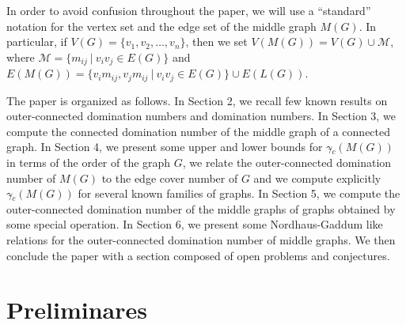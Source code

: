 \documentclass[a4paper,12pt, reqno]{amsart}
\begin{document}

In order to avoid confusion throughout the paper, we will use a ``standard'' notation for the vertex set and the edge set of the middle graph $M(G)$. In particular, if $V(G)=\{v_1,v_2,\dots, v_n\}$, then we set $V(M(G))=V(G)\cup \mathcal{M}$, where $\mathcal{M}=\{m_{ij}~|~ v_iv_j\in E(G)\}$ and $E(M(G))=\{v_im_{ij},v_jm_{ij}~|~ v_iv_j\in E(G)\}\cup E(L(G)) $.



The paper is organized as follows. In Section 2, we recall few known results on outer-connected domination numbers and domination numbers. In Section 3, we compute the connected domination number of the middle graph of a connected graph. In Section 4, we present some upper and lower bounds for $\gamma{\tilde{}} _{c}(M(G))$ in terms of the order of the graph $G$, we relate the outer-connected domination number of $M(G)$ to the edge cover number of $G$ and we compute explicitly $\gamma{\tilde{}} _{c}(M(G))$ for several known families of graphs. In Section 5, we compute the outer-connected domination number of the middle graphs of graphs obtained by some special operation. In Section 6, we present some Nordhaus-Gaddum like relations for the outer-connected domination number of middle graphs. We then conclude the paper with a section composed of open problems and conjectures.

\section{Preliminares}
\end{document}
